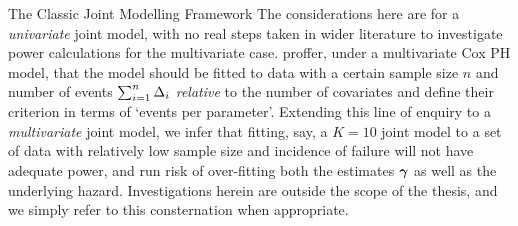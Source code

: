 \begin{chapter}{\label{cha:methods-classic}The Classic Joint Modelling Framework}
  The considerations here are for a \textit{univariate} joint model, with no real steps taken in wider literature to investigate power calculations for the multivariate case. \citet{Riley2019} proffer, under a multivariate Cox PH model, that the model should be fitted to data with a certain sample size $n$ and number of events $\sum_{i=1}^n\Delta_i$ \textit{relative} to the number of covariates and define their criterion in terms of `events per parameter'. Extending this line of enquiry to a \textit{multivariate} joint model, we infer that fitting, say, a $K=10$ joint model to a set of data with relatively low sample size and incidence of failure will not have adequate power, and run risk of over-fitting both the estimates $\bm{\gamma}$ as well as the underlying hazard. Investigations herein are outside the scope of the thesis, and we simply refer to this consternation when appropriate.

\end{chapter}